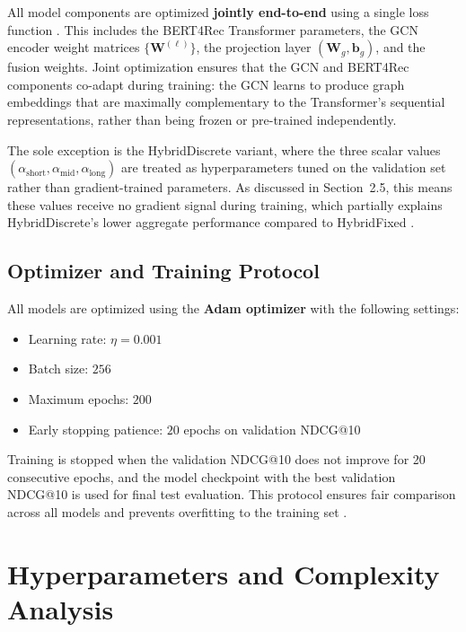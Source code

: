 \documentclass[12pt,a4paper]{report}
\newcommand{\parencite}[1]{\citep{#1}}
\begin{document}
All model components are optimized \textbf{jointly end-to-end}
using a single loss function \parencite{ouledmeriem2025hybrid}.
This includes the BERT4Rec Transformer parameters, the GCN
encoder weight matrices $\{\mathbf{W}^{(\ell)}\}$, the projection
layer $(\mathbf{W}_g, \mathbf{b}_g)$, and the fusion weights.
Joint optimization ensures that the GCN and BERT4Rec components
co-adapt during training: the GCN learns to produce graph
embeddings that are maximally complementary to the Transformer's
sequential representations, rather than being frozen or
pre-trained independently.

The sole exception is the HybridDiscrete variant, where the three
scalar values $(\alpha_{\text{short}}, \alpha_{\text{mid}},
\alpha_{\text{long}})$ are treated as hyperparameters tuned on
the validation set rather than gradient-trained parameters.
As discussed in Section~2.5, this means these values receive no
gradient signal during training, which partially explains
HybridDiscrete's lower aggregate performance compared to
HybridFixed \parencite{ouledmeriem2025hybrid}.

\subsection{Optimizer and Training Protocol}

All models are optimized using the \textbf{Adam optimizer}
\parencite{kingma2015adam} with the following settings:
\begin{itemize}
  \item Learning rate: $\eta = 0.001$
  \item Batch size: $256$
  \item Maximum epochs: $200$
  \item Early stopping patience: $20$ epochs on validation NDCG@10
\end{itemize}

Training is stopped when the validation NDCG@10 does not improve
for 20 consecutive epochs, and the model checkpoint with the best
validation NDCG@10 is used for final test evaluation. This
protocol ensures fair comparison across all models and prevents
overfitting to the training set \parencite{ouledmeriem2025hybrid}.

\section{Hyperparameters and Complexity Analysis}
\end{document}
